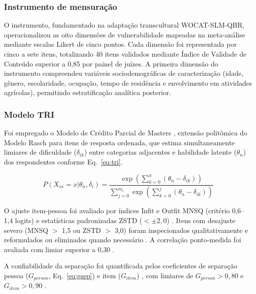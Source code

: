 \documentclass[pdflatex,sn-basic]{sn-jnl}%
\theoremstyle{thmstyleone}%
\theoremstyle{thmstyletwo}%
\theoremstyle{thmstylethree}%
\begin{document}
\subsubsection{Instrumento de mensuração}\label{subsubsec:instrumento}

O instrumento, fundamentado na adaptação transcultural WOCAT-SLM-QBR, operacionalizou as oito dimensões de vulnerabilidade mapeadas na meta-análise mediante escalas Likert de cinco pontos. Cada dimensão foi representada por cinco a sete itens, totalizando 40 itens validados mediante Índice de Validade de Conteúdo superior a 0,85 por painel de juízes. A primeira dimensão do instrumento compreendeu variáveis sociodemográficas de caracterização (idade, gênero, escolaridade, ocupação, tempo de residência e envolvimento em atividades agrícolas), permitindo estratificação analítica posterior.

\subsubsection{Modelo TRI}\label{subsubsec:modelo_tri}

Foi empregado o Modelo de Crédito Parcial de Masters \citep{Masters1982}, extensão politômica do Modelo Rasch \citep{Rasch1960} para itens de resposta ordenada, que estima simultaneamente limiares de dificuldade ($\delta_{ik}$) entre categorias adjacentes e habilidade latente ($\theta_n$) dos respondentes conforme Eq.~\ref{eq:tri}.

\begin{equation}
P(X_{ni}=x|\theta_n, \delta_i) = \frac{\exp\left(\sum_{k=0}^{x}(\theta_n - \delta_{ik})\right)}{\sum_{j=0}^{m_i}\exp\left(\sum_{k=0}^{j}(\theta_n - \delta_{ik})\right)}
\label{eq:tri}
\end{equation}

O ajuste item-pessoa foi avaliado por índices Infit e Outfit MNSQ (critério 0,6--1,4 logits) e estatísticas padronizadas ZSTD ($< \pm 2{,}0$) \citep{Wright1994,Linacre2002}. Itens com desajuste severo (MNSQ $>$ 1,5 ou ZSTD $>$ 3,0) foram inspecionados qualitativamente e reformulados ou eliminados quando necessário \citep{Wilson2005}. A correlação ponto-medida foi avaliada com limiar superior a 0,30 \citep{Bond2020}.

A confiabilidade da separação foi quantificada pelos coeficientes de separação pessoa ($G_{person}$, Eq.~\ref{eq:gsep}) e item ($G_{item}$) \citep{Wright1996}, com limiares de $G_{person} > 0{,}80$ e $G_{item} > 0{,}90$ \citep{Fisher2007}.
\end{document}
